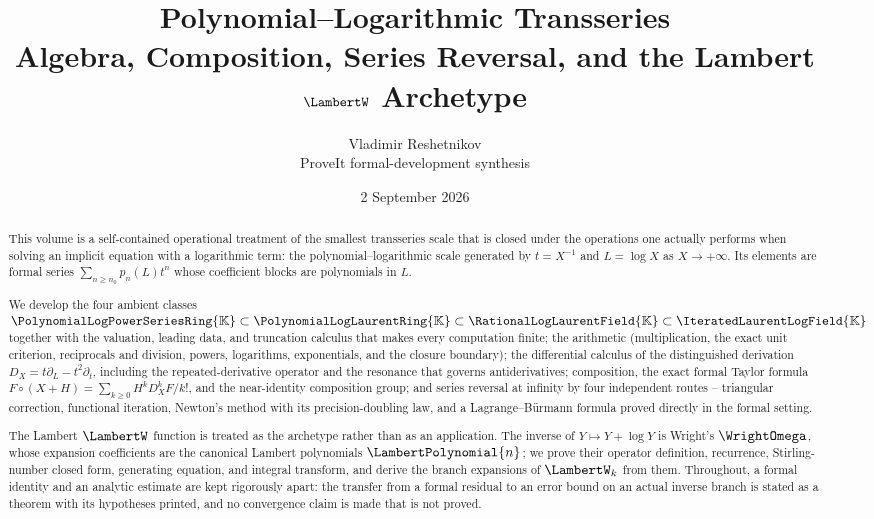 \documentclass[11pt,oneside]{article}
\theoremstyle{plain}
\theoremstyle{definition}
\theoremstyle{remark}
\newcommand{\K}{\mathbb{K}}
\newcommand{\PLpow}{\PolynomialLogPowerSeriesRing{\K}}   %
\newcommand{\PLlau}{\PolynomialLogLaurentRing{\K}}       %
\newcommand{\PLrat}{\RationalLogLaurentField{\K}}        %
\newcommand{\PLit}{\IteratedLaurentLogField{\K}}         %
\newcommand{\DX}{D_{X}}                                  %
\newcommand{\compose}{\mathbin{\circ}}
\newcommand{\LamP}[1]{\LambertPolynomial{#1}}
\begin{document}
\title{\textbf{Polynomial--Logarithmic Transseries}\\[0.35em]
  \Large Algebra, Composition, Series Reversal, and the Lambert
  \texorpdfstring{\(\LambertW\)}{W} Archetype}
\author{Vladimir Reshetnikov\\
  \small ProveIt formal-development synthesis}
\date{2 September 2026}

\maketitle

\begin{abstract}
This volume is a self-contained operational treatment of the smallest
transseries scale that is closed under the operations one actually performs
when solving an implicit equation with a logarithmic term: the
polynomial--logarithmic scale generated by \(t=X^{-1}\) and \(L=\log X\) as
\(X\to+\infty\).  Its elements are formal series
\(\sum_{n\ge n_{0}}p_{n}(L)t^{n}\) whose coefficient blocks are polynomials in
\(L\).

We develop the four ambient classes \(\PLpow\subset\PLlau\subset\PLrat\subset
\PLit\) together with the valuation, leading data, and truncation calculus that
makes every computation finite; the arithmetic (multiplication, the exact unit
criterion, reciprocals and division, powers, logarithms, exponentials, and the
closure boundary); the differential calculus of the distinguished derivation
\(\DX=t\partial_{L}-t^{2}\partial_{t}\), including the repeated-derivative
operator and the resonance that governs antiderivatives; composition, the exact
formal Taylor formula \(F\compose(X+H)=\sum_{k\ge0}H^{k}\DX^{k}F/k!\), and the
near-identity composition group; and series reversal at infinity by four
independent routes -- triangular correction, functional iteration, Newton's
method with its precision-doubling law, and a Lagrange--B\"urmann formula
proved directly in the formal setting.

The Lambert \(\LambertW\) function is treated as the archetype rather than as
an application.  The inverse of \(Y\mapsto Y+\log Y\) is Wright's
\(\WrightOmega\), whose expansion coefficients are the canonical Lambert
polynomials \(\LamP{n}\); we prove their operator definition, recurrence,
Stirling-number closed form, generating equation, and integral transform, and
derive the branch expansions of \(\LambertW_{k}\) from them.  Throughout, a
formal identity and an analytic estimate are kept rigorously apart: the
transfer from a formal residual to an error bound on an actual inverse branch
is stated as a theorem with its hypotheses printed, and no convergence claim is
made that is not proved.


\end{abstract}
\end{document}
